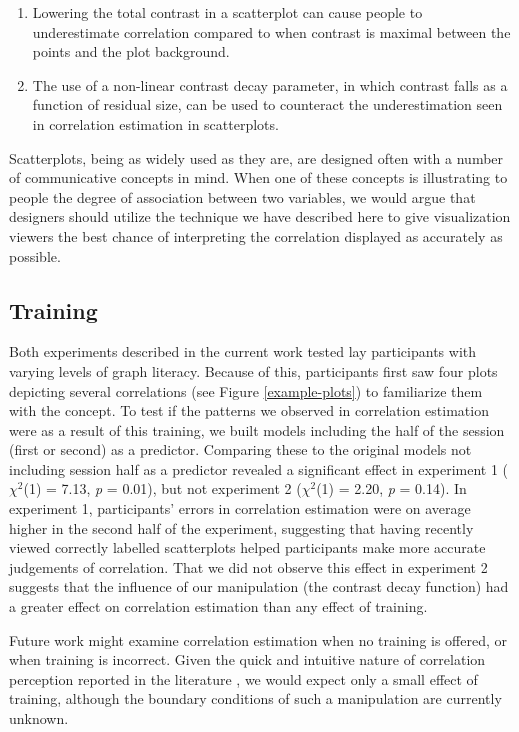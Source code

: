 \documentclass[preprint, 3p,
authoryear]{elsarticle} %
\begin{document}
\begin{enumerate}
\def\labelenumi{\arabic{enumi}.}
\item
  Lowering the total contrast in a scatterplot can cause people to
  underestimate correlation compared to when contrast is maximal between
  the points and the plot background.
\item
  The use of a non-linear contrast decay parameter, in which contrast
  falls as a function of residual size, can be used to counteract the
  underestimation seen in correlation estimation in scatterplots.
\end{enumerate}

Scatterplots, being as widely used as they are, are designed often with
a number of communicative concepts in mind. When one of these concepts
is illustrating to people the degree of association between two
variables, we would argue that designers should utilize the technique we
have described here to give visualization viewers the best chance of
interpreting the correlation displayed as accurately as possible.

\hypertarget{training}{%
\subsection{Training}\label{training}}

Both experiments described in the current work tested lay participants
with varying levels of graph literacy. Because of this, participants
first saw four plots depicting several correlations (see Figure
\ref{example-plots}) to familiarize them with the concept. To test if
the patterns we observed in correlation estimation were as a result of
this training, we built models including the half of the session (first
or second) as a predictor. Comparing these to the original models not
including session half as a predictor revealed a significant effect in
experiment 1 (\(\chi^2\)(1) = 7.13, \emph{p} = 0.01), but not experiment
2 (\(\chi^2\)(1) = 2.20, \emph{p} = 0.14). In experiment 1,
participants' errors in correlation estimation were on average higher in
the second half of the experiment, suggesting that having recently
viewed correctly labelled scatterplots helped participants make more
accurate judgements of correlation. That we did not observe this effect
in experiment 2 suggests that the influence of our manipulation (the
contrast decay function) had a greater effect on correlation estimation
than any effect of training.

Future work might examine correlation estimation when no training is
offered, or when training is incorrect. Given the quick and intuitive
nature of correlation perception reported in the literature
\citep{rensink_2014}, we would expect only a small effect of training,
although the boundary conditions of such a manipulation are currently
unknown.
\end{document}
